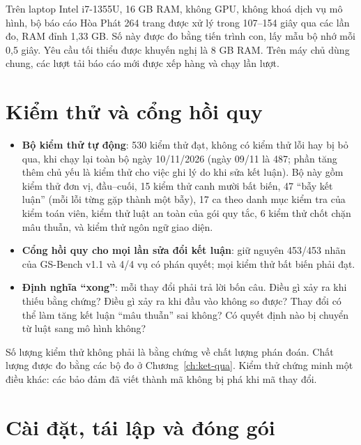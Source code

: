 Trên laptop Intel i7-1355U, 16 GB RAM, không GPU, không khoá dịch vụ mô hình, bộ báo cáo Hòa Phát 264 trang được xử lý trong 107–154 giây qua các lần đo, RAM đỉnh 1,33 GB. Số này được đo bằng tiến trình con, lấy mẫu bộ nhớ mỗi 0,5 giây. Yêu cầu tối thiểu được khuyến nghị là 8 GB RAM. Trên máy chủ dùng chung, các lượt tải báo cáo mới được xếp hàng và chạy lần lượt.

\section{Kiểm thử và cổng hồi quy}

\begin{itemize}
\item \textbf{Bộ kiểm thử tự động}: 530 kiểm thử đạt, không có kiểm thử lỗi hay bị bỏ qua, khi chạy lại toàn bộ ngày 10/11/2026 (ngày 09/11 là 487; phần tăng thêm chủ yếu là kiểm thử cho việc ghi lý do khi sửa kết luận). Bộ này gồm kiểm thử đơn vị, đầu–cuối, 15 kiểm thử canh mười bất biến, 47 “bẫy kết luận” (mỗi lỗi từng gặp thành một bẫy), 17 ca theo danh mục kiểm tra của kiểm toán viên, kiểm thử luật an toàn của gói quy tắc, 6 kiểm thử chốt chặn mâu thuẫn, và kiểm thử ngôn ngữ giao diện.
\item \textbf{Cổng hồi quy cho mọi lần sửa đổi kết luận}: giữ nguyên 453/453 nhãn của GS-Bench v1.1 và 4/4 vụ có phán quyết; mọi kiểm thử bất biến phải đạt.
\item \textbf{Định nghĩa “xong”}: mỗi thay đổi phải trả lời bốn câu. Điều gì xảy ra khi thiếu bằng chứng? Điều gì xảy ra khi đầu vào không so được? Thay đổi có thể làm tăng kết luận “mâu thuẫn” sai không? Có quyết định nào bị chuyển từ luật sang mô hình không?
\end{itemize}

Số lượng kiểm thử không phải là bằng chứng về chất lượng phán đoán. Chất lượng được đo bằng các bộ đo ở Chương~\ref{ch:ket-qua}. Kiểm thử chứng minh một điều khác: các bảo đảm đã viết thành mã không bị phá khi mã thay đổi.

\section{Cài đặt, tái lập và đóng gói}

